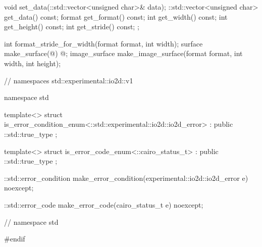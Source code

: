 \begin{codeblock}
{{{{{    void set_data(::std::vector<unsigned char>& data);
    ::std::vector<unsigned char> get_data() const;
    format get_format() const;
    int get_width() const;
    int get_height() const;
    int get_stride() const;
  };

  int format_stride_for_width(format format, int width);
  surface make_surface(@\impdef@) @\impdef@;
  image_surface make_image_surface(format format, int width, int height);
} } } } // namespaces std::experimental::io2d::v1

namespace std {
	template<>
	struct is_error_condition_enum<::std::experimental::io2d::io2d_error>
		: public ::std::true_type{ };

	template<>
	struct is_error_code_enum<::cairo_status_t>
		: public ::std::true_type{ };

	::std::error_condition make_error_condition(experimental::io2d::io2d_error 
	e) noexcept;

	::std::error_code make_error_code(cairo_status_t e) noexcept;
} // namespace std

#endif
\end{codeblock}
%
